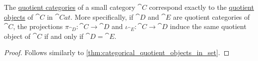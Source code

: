 \begin{proposition}\label{thm:quotient_categories_and_subobjects}
  The \hyperref[def:quotient_category]{quotient categories} of a small category \( \cat{C} \) correspond exactly to the \hyperref[def:categorical_quotient_object]{quotient objects} of \( \cat{C} \) in \( \cat{Cat} \). More specifically, if \( \cat{D} \) and \( \cat{E} \) are quotient categories of \( \cat{C} \), the projections \( \pi_{\cat{D}}: \cat{C} \to \cat{D} \) and \( \iota_{\cat{E}}: \cat{C} \to \cat{D} \) induce the same quotient object of \( \cat{C} \) if and only if \( \cat{D} = \cat{E} \).
\end{proposition}
\begin{proof}
  Follows similarly to \cref{thm:categorical_quotient_objects_in_set}.
\end{proof}
